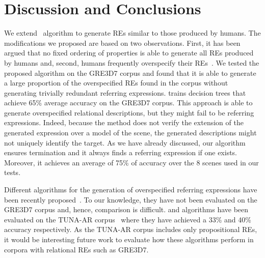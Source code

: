 \section{Discussion and Conclusions} \label{sec:discussion}

We extend~ algorithm to generate REs similar to those produced by humans. The modifications 
we proposed are based on two observations. First, it has been argued that no fixed ordering of properties is able to generate all REs produced by humans and, second, humans frequently overspecify their REs~\cite{Engelhardt_Bailey_Ferreira_2006,Arts_Maes_Noordman_Jansen_2011,viet:gene11}. We tested 
the proposed algorithm on the GRE3D7 corpus and found that it is able to generate a large proportion of the overspecified REs found in the corpus without generating trivially redundant referring expressions.
%
 trains decision trees that achieve 65\% average accuracy on the GRE3D7 corpus. 
This approach is able to generate overspecified relational descriptions, but they might fail to be referring 
expressions. Indeed, because the  method does not verify the extension of the generated expression over a model of the scene, the 
generated descriptions might not uniquely identify the target.  As we have already discussed,
our algorithm ensures termination and it always finds a referring expression if one exists.  Moreover, it achieves an average of 75\% of accuracy over the 8 scenes used in our tests. 

Different algorithms for the generation of overspecified referring expressions have been recently proposed~\cite{delucena-paraboni:2008:ENLG,ruud-emiel-mariet:2012:INLG2012}.  To our knowledge, they have not been evaluated on the 
GRE3D7 corpus and, hence, comparison is difficult.  and  algorithms
have been evaluated on the TUNA-AR corpus~\cite{gatt-balz-kow:2008:ENLG} where they have achieved a 33\% and 40\% accuracy respectively. 
As the TUNA-AR corpus includes only propositional REs, it would be interesting future work to evaluate how these algorithms perform in corpora with relational REs such as GRE3D7. 


